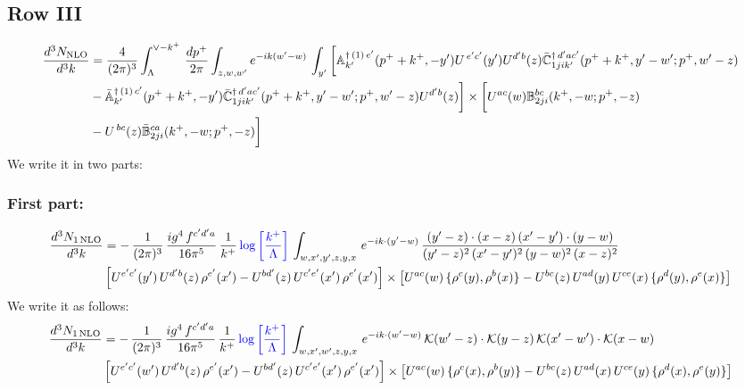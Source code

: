 \documentclass[9pt]{article}
\def\mf#1{\mathbb{#1}}
\numberwithin{equation}{section}
\begin{document}
 \subsection{Row III}
 \begin{align}
    \frac{d^{3}N_{\rm NLO}}{d^{3}k} & =   \frac{4}{(2\pi)^{3}} \int_{\Lambda}^{\vee -k^{+}}\, \frac{dp^{+}}{2\pi}\int_{z,w,w^{\prime}} e^{-ik(w^{\prime}-w)}\,\int_{y^{\prime}}\bigg[\mf{A}^{\dagger\, (1)\,e^{\prime}}_{k^{\prime}}(p^{+}+k^{+},-y^{\prime})U^{\, e^{\prime}c^{\prime}}(y^{\prime})U^{d^{\prime}b}(z) \Bar{\mf{C}}^{\dagger\, d^{\prime}ac^{\prime}}_{1jik^{\prime}}(p^{+}+k^{+},y^{\prime}-w^{\prime}; p^{+},w^{\prime}-z)\notag \\ &  -\Bar{\mf{A}}^{\dagger\, (1)\,c^{\prime}}_{k^{\prime}}(p^{+}+k^{+},-y^{\prime}) \Bar{\mf{C}}^{\dagger\, d^{\prime}ac^{\prime}}_{1jik^{\prime}}(p^{+}+k^{+},y^{\prime}-w^{\prime}; p^{+},w^{\prime}-z)U^{d^{\prime}b}(z)\bigg] \times \bigg[U^{ac}(w) \mf{B}^{bc}_{2ji}(k^{+},-w;p^{+},-z)\notag \\ &  -U^{\, bc}(z)\Bar{\mf{B}}^{ca}_{2ji}(k^{+},-w; p^{+},-z)\bigg]\nonumber
\end{align}
We write it in two parts:
\subsubsection{First part:}
\begin{align}
     \frac{d^{3}N_{1\,\rm NLO}}{d^{3}k} & = -\,\frac{1}{(2\pi)^{3}}\, \frac{ig^{4}\,f^{c'd'a}}{16\pi^{5}}\, \frac{1}{k^{+}}\,{\color{blue}\log{\left[\frac{k^{+}}{\Lambda}\right]}}\, \int_{w,x',y',z,y,x}\, e^{-ik\cdot (y'-w)}\,\frac{(y'-z)\cdot (x-z)\,(x'-y')\cdot (y-w)}{(y'-z)^{2}\,(x'-y')^{2}\,(y-w)^{2}\,(x-z)^{2}}\notag \\ &  \left[U^{e'c'}(y')\,U^{d'b}(z)\,\rho^{e'}(x')-U^{bd'}(z)\,U^{c'e'}(x')\,\rho^{e'}(x')\right]\times  \left[U^{ac}(w)\, \{\rho^{c}(y),\rho^{b}(x)\}-U^{bc}(z)\,U^{ad}(y)\,U^{ce}(x)\,\{\rho^{d}(y),\rho^{e}(x)\}\right]
\end{align} 
We write it as follows:
\begin{align}
     \frac{d^{3}N_{1\,\rm NLO}}{d^{3}k} & = -\,\frac{1}{(2\pi)^{3}}\, \frac{ig^{4}\,f^{c'd'a}}{16\pi^{5}}\, \frac{1}{k^{+}}\,{\color{blue}\log{\left[\frac{k^{+}}{\Lambda}\right]}}\, \int_{w,x',w',z,y,x}\, e^{-ik\cdot (w'-w)}\,\mathcal{K}(w'-z)\cdot \mathcal{K}(y-z)\,\mathcal{K}(x'-w')\cdot \mathcal{K}(x-w)\notag \\ &  \left[U^{e'c'}(w')\,U^{d'b}(z)\,\rho^{e'}(x')-U^{bd'}(z)\,U^{c'e'}(x')\,\rho^{e'}(x')\right]\times  \left[U^{ac}(w)\, \{\rho^{c}(x),\rho^{b}(y)\}-U^{bc}(z)\,U^{ad}(x)\,U^{ce}(y)\,\{\rho^{d}(x),\rho^{e}(y)\}\right]
\end{align} 
\end{document}
